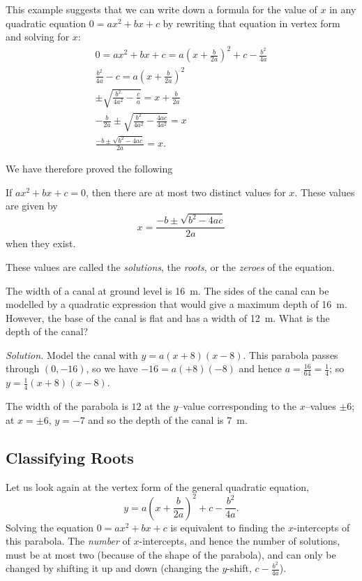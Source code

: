 This example suggests that we can write down a formula for the value of $ x $ in any quadratic equation $ 0 = ax^2 + bx + c $
by rewriting that equation in vertex form and solving for $ x $:
\begin{gather*}
  0 = ax^2 + bx + c = a\left(x + \frac{b}{2a}\right)^2 + c - \frac{b^2}{4a}\\
  \frac{b^2}{4a} - c = a\left(x + \frac{b}{2a}\right)^2\\
  \pm\sqrt{\frac{b^2}{4a^2} - \frac{c}{a}} = x + \frac{b}{2a}\\
  - \frac{b}{2a} \pm\sqrt{\frac{b^2}{4a^2} - \frac{4ac}{4a^2}} = x\\
  \frac{-b \pm \sqrt{b^2 - 4ac}}{2a} = x.
\end{gather*}

We have therefore proved the following
\begin{thm}
  If $ ax^2 + bx + c = 0 $, then there are at most two distinct values for $ x $. These values are given by
  \begin{displaymath}
    x = \frac{-b \pm \sqrt{b^2 - 4ac}}{2a}
  \end{displaymath}
  when they exist.
\end{thm}

These values are called the \emph{solutions}, the \emph{roots}, or the \emph{zeroes} of the equation.

\begin{ex}
  The width of a canal at ground level is \SI{16}{\metre}. The sides of the canal can  be modelled by a quadratic expression
  that would give a maximum depth of \SI{16}{\metre}. However, the base of the canal is flat and has a width of \SI{12}{\metre}.
  What is the depth of the canal?

  \textit{Solution.} Model the canal with $ y = a(x + 8)(x - 8) $. This parabola passes through $ (0, -16) $, so we have $ -16 = a(+8)(-8) $
  and hence $ a = \frac{16}{64} = \frac{1}{4} $; so $ y = \frac{1}{4}(x + 8)(x - 8) $.

  The width of the parabola is $ 12 $ at the $ y$--value corresponding to the $ x$--values $ \pm 6 $; at $ x = \pm 6 $, $ y = -7 $
  and so the depth of the canal is \SI{7}{\metre}.
\end{ex}

\clearpage
\subsection*{Classifying Roots}
Let us look again at the vertex form of the general quadratic equation,
\begin{displaymath}
  y = a\left(x + \frac{b}{2a}\right)^2 + c - \frac{b^2}{4a}.
\end{displaymath}
Solving the equation $ 0 = ax^2 + bx + c $ is equivalent to finding the $ x$-intercepts of this parabola. The \emph{number} of $ x$-intercepts,
and hence the number of solutions, must be at most two (because of the shape of the parabola), and can only be changed by shifting it up and
down (changing the $ y$-shift, $ c - \frac{b^2}{4a} $).

